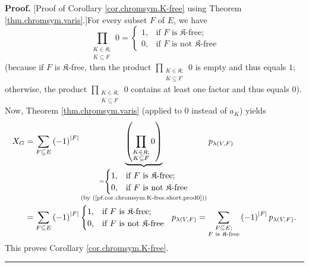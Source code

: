 \documentclass[numbers=enddot,12pt,final,onecolumn,notitlepage]{scrartcl}%
\theoremstyle{definition}
\newenvironment{proof}[1][Proof]{\noindent\textbf{#1.} }{\ \rule{0.5em}{0.5em}}
\newenvironment{vershort}{}{}
\let\sumnonlimits\sum
\let\prodnonlimits\prod
\renewcommand{\sum}{\sumnonlimits\limits}
\renewcommand{\prod}{\prodnonlimits\limits}
\begin{document}
\begin{vershort}
\begin{proof}
[Proof of Corollary \ref{cor.chromsym.K-free} using Theorem
\ref{thm.chromsym.varis}.]For every subset $F$ of $E$, we have%
\begin{equation}
\prod_{\substack{K\in\mathfrak{K};\\K\subseteq F}}0=%
\begin{cases}
1, & \text{if }F\text{ is }\mathfrak{K}\text{-free;}\\
0, & \text{if }F\text{ is not }\mathfrak{K}\text{-free}%
\end{cases}
\label{pf.cor.chromsym.K-free.short.prod0}%
\end{equation}
(because if $F$ is $\mathfrak{K}$-free, then the product $\prod
_{\substack{K\in\mathfrak{K};\\K\subseteq F}}0$ is empty and thus equals $1$;
otherwise, the product $\prod_{\substack{K\in\mathfrak{K};\\K\subseteq F}}0$
contains at least one factor and thus equals $0$). Now, Theorem
\ref{thm.chromsym.varis} (applied to $0$ instead of $a_{K}$) yields%
\begin{align*}
X_{G}  &  =\sum_{F\subseteq E}\left(  -1\right)  ^{\left\vert F\right\vert
}\underbrace{\left(  \prod_{\substack{K\in\mathfrak{K};\\K\subseteq
F}}0\right)  }_{\substack{=%
\begin{cases}
1, & \text{if }F\text{ is }\mathfrak{K}\text{-free;}\\
0, & \text{if }F\text{ is not }\mathfrak{K}\text{-free}%
\end{cases}
\\\text{(by (\ref{pf.cor.chromsym.K-free.short.prod0}))}}}p_{\lambda\left(
V,F\right)  }\\
&  =\sum_{F\subseteq E}\left(  -1\right)  ^{\left\vert F\right\vert }%
\begin{cases}
1, & \text{if }F\text{ is }\mathfrak{K}\text{-free;}\\
0, & \text{if }F\text{ is not }\mathfrak{K}\text{-free}%
\end{cases}
\ \ p_{\lambda\left(  V,F\right)  }=\sum_{\substack{F\subseteq E;\\F\text{ is
}\mathfrak{K}\text{-free}}}\left(  -1\right)  ^{\left\vert F\right\vert
}p_{\lambda\left(  V,F\right)  }.
\end{align*}
This proves Corollary \ref{cor.chromsym.K-free}.
\end{proof}
\end{vershort}
\end{document}
